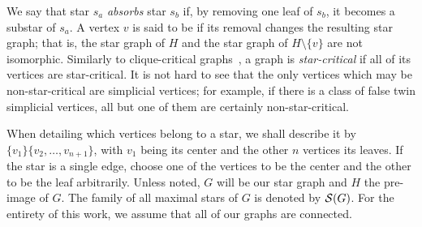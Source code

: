 We say that star $s_a$ \textit{absorbs} star $s_b$ if, by removing one leaf of $s_b$, it becomes a substar of $s_a$.
A vertex $v$ is said to be  if its removal changes the resulting star graph; that is, the star graph of $H$ and the star graph of $H \setminus \{v\}$ are not isomorphic.
Similarly to clique-critical graphs~\cite{clique_critical_toft,clique_critical_alcon}, a graph is \textit{star-critical} if all of its vertices are star-critical.
It is not hard to see that the only vertices which may be non-star-critical are simplicial vertices; for example, if there is a class of false twin simplicial vertices, all but one of them are certainly non-star-critical.

When detailing which vertices belong to a star, we shall describe it by $\{v_1\}\{v_2, \dots, v_{n+1}\}$, with $v_1$ being its center and the other $n$ vertices its leaves.
If the star is a single edge, choose one of the vertices to be the center and the other to be the leaf arbitrarily.
Unless noted, $G$ will be our star graph and $H$ the pre-image of $G$.
The family of all maximal stars of $G$ is denoted by $\mathcal{S}(G)$.
For the entirety of this work, we assume that all of our graphs are connected.




